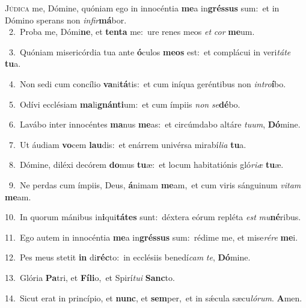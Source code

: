 \lettrine{\initial\textcolor{\initialcolor}{J}}{údica} me, Dómine, quóniam ego in innocéntia \textbf{me}\-a in\-\textbf{grés}\-\textbf{sus} sum:~\star et in Dómino sperans non \textit{in}\-\textit{fir}\textbf{má}bor.\\
{\numbfont\textcolor{\numbcolor}{~2.}}~Proba me, Dómi\-\textbf{ne}\-, et \textbf{ten}\-\textbf{ta} me:~\star ure renes meos \textit{et} \textit{cor} \textbf{me}\-um.\par
{\numbfont\textcolor{\numbcolor}{~3.}}~Quóniam misericórdia tua ante \textbf{ó}\-culos \textbf{me}\-\textbf{os} est:~\star et complácui in veri\-\textit{tá}\-\textit{te} \textbf{tu}\-a.\par
{\numbfont\textcolor{\numbcolor}{~4.}}~Non sedi cum concílio \textbf{va}\-ni\-\textbf{tá}\-tis:~\star et cum iníqua geréntibus non \textit{in}\-\textit{tro}\textbf{í}bo.\par
{\numbfont\textcolor{\numbcolor}{~5.}}~Odívi ecclésiam \textbf{ma}\-li\-\textbf{gnán}\-\textbf{ti}um:~\star et cum ímpiis \textit{non} \textit{se}\-\textbf{dé}bo.\par
{\numbfont\textcolor{\numbcolor}{~6.}}~Lavábo inter innocéntes \textbf{ma}\-nus \textbf{me}\-as:~\star et circúmdabo altáre \textit{tu}\-\textit{um}, \textbf{Dó}\-mine.\par
{\numbfont\textcolor{\numbcolor}{~7.}}~Ut áudiam \textbf{vo}\-cem \textbf{lau}\-dis:~\star et enárrem univérsa mirabí\-\textit{li}\-\textit{a} \textbf{tu}\-a.\par
{\numbfont\textcolor{\numbcolor}{~8.}}~Dómine, diléxi decórem \textbf{do}\-mus \textbf{tu}\-æ:~\star et locum habitatiónis gló\-\textit{ri}\-\textit{æ} \textbf{tu}\-æ.\par
{\numbfont\textcolor{\numbcolor}{~9.}}~Ne perdas cum ímpiis, Deus, \textbf{á}\-nimam \textbf{me}\-am,~\star et cum viris sánguinum \textit{vi}\-\textit{tam} \textbf{me}\-am.\par
{\numbfont\textcolor{\numbcolor}{10.}}~In quorum mánibus in\-\textbf{i}\-qui\-\textbf{tá}\-\textbf{tes} sunt:~\star déxtera eórum repléta \textit{est} \textit{mu}\-\textbf{né}ribus.\par
{\numbfont\textcolor{\numbcolor}{11.}}~Ego autem in innocéntia \textbf{me}\-a in\-\textbf{grés}\-\textbf{sus} sum:~\star rédime me, et mise\-\textit{ré}\-\textit{re} \textbf{me}\-i.\par
{\numbfont\textcolor{\numbcolor}{12.}}~Pes meus stetit \textbf{in} di\-\textbf{réc}\-to:~\star in ecclésiis benedí\textit{cam} \textit{te}\-, \textbf{Dó}\-mine.\par
{\numbfont\textcolor{\numbcolor}{13.}}~Glória \textbf{Pa}\-tri, et \textbf{Fí}\-\textbf{li}o,~\star et Spirí\-\textit{tu}\-\textit{i} \textbf{Sanc}\-to.\par
{\numbfont\textcolor{\numbcolor}{14.}}~Sicut erat in princípio, et \textbf{nunc}\-, et \textbf{sem}\-per,~\star et in sǽcula sæcu\-\textit{ló}\-\textit{rum}. \textbf{A}\-men.\par
